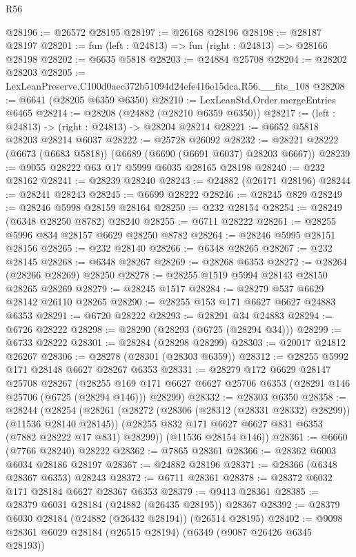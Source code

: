 \begin{lexlean}{R56}
\begin{coremodule}
@28196 := @26572 @28195
@28197 := @26168 @28196
@28198 := @28187 @28197
@28201 := fun (left : @24813) => fun (right : @24813) => @28166 @28198
@28202 := @6635 @5818
@28203 := @24884 @25708
@28204 := @28202 @28203
@28205 := LexLeanPreserve.C100d0aec372b51094d24efe416e15dca.R56.__fits_108
@28208 := @6641 (@28205 @6359 @6350)
@28210 := LexLeanStd.Order.mergeEntries @6465
@28214 := @28208 (@24882 (@28210 @6359 @6350))
@28217 := (left : @24813) -> (right : @24813) -> @28204 @28214
@28221 := @6652 @5818 @28203 @28214 @6037
@28222 := @25728 @26092
@28232 := @28221 @28222 (@6673 (@6683 @5818)) (@6689 (@6690 (@6691 @6037) @28203 @6667))
@28239 := @9055 @28222 @63 @17 @5999 @6035 @28165 @28198
@28240 := @232 @28162
@28241 := @28239 @28240
@28243 := @24882 (@26171 @28196)
@28244 := @28241 @28243
@28245 := @6699 @28222
@28246 := @28245 @829
@28249 := @28246 @5998 @28159 @28164
@28250 := @232 @28154
@28254 := @28249 (@6348 @28250 @8782) @28240
@28255 := @6711 @28222
@28261 := @28255 @5996 @834 @28157 @6629 @28250 @8782
@28264 := @28246 @5995 @28151 @28156
@28265 := @232 @28140
@28266 := @6348 @28265
@28267 := @232 @28145
@28268 := @6348 @28267
@28269 := @28268 @6353
@28272 := @28264 (@28266 @28269) @28250
@28278 := @28255 @1519 @5994 @28143 @28150 @28265 @28269
@28279 := @28245 @1517
@28284 := @28279 @537 @6629 @28142 @26110 @28265
@28290 := @28255 @153 @171 @6627 @6627 @24883 @6353
@28291 := @6720 @28222
@28293 := @28291 @34 @24883
@28294 := @6726 @28222
@28298 := @28290 (@28293 (@6725 (@28294 @34)))
@28299 := @6733 @28222
@28301 := @28284 (@28298 @28299)
@28303 := @20017 @24812 @26267
@28306 := @28278 (@28301 (@28303 @6359))
@28312 := @28255 @5992 @171 @28148 @6627 @28267 @6353
@28331 := @28279
    @172
    @6629
    @28147
    @25708
    @28267
    (@28255 @169 @171 @6627 @6627 @25706 @6353 (@28291 @146 @25706 (@6725 (@28294 @146))) @28299)
@28332 := @28303 @6350
@28358 := @28244
    (@28254
      (@28261
        (@28272 (@28306 (@28312 (@28331 @28332) @28299)) (@11536 @28140 @28145))
        (@28255 @832 @171 @6627 @6627 @831 @6353 (@7882 @28222 @17 @831) @28299))
      (@11536 @28154 @146))
@28361 := @6660 (@7766 @28240) @28222
@28362 := @7865 @28361
@28366 := @28362 @6003 @6034 @28186 @28197
@28367 := @24882 @28196
@28371 := @28366 (@6348 @28367 @6353) @28243
@28372 := @6711 @28361
@28378 := @28372 @6032 @171 @28184 @6627 @28367 @6353
@28379 := @9413 @28361
@28385 := @28379 @6031 @28184 (@24882 (@26435 @28195)) @28367
@28392 := @28379 @6030 @28184 (@24882 (@26432 @28194)) (@26514 @28195)
@28402 := @9098 @28361 @6029 @28184 (@26515 @28194) (@6349 (@9087 @26426 @6345 @28193))

\end{coremodule}
\end{lexlean}
